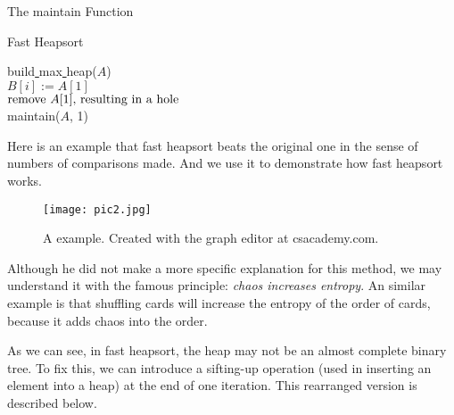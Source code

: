 \documentclass[12pt]{extarticle}
\newcommand{\<}{\langle}
\renewcommand{\>}{\rangle}
\theoremstyle{definition}
\newcommand{\udl}{\underline{ }}
\begin{document}
\begin{algorithm}[H]
	\caption{The {\con maintain} Function}
	\label{algo:heapsort_improved_maintain}
	\LinesNumbered
\end{algorithm}

\begin{algorithm}[H]
	\caption{Fast Heapsort}
	\label{algo:heapsort_improved}
	\LinesNumbered
	{\con build\udl max\udl heap($A$)} \\
		{
		{\con $B[i] := A[1]$} \\
		$\textnormal{remove } A[1] \textnormal{, resulting in a hole}$ \\
		{\con maintain($A$, 1)}
	}
\end{algorithm}

Here is an example that fast heapsort beats the original one in the sense of numbers of comparisons made. And we use it to demonstrate how fast heapsort works.

\begin{figure}[H]
	\centering
	\texttt{[image: pic2.jpg]}
	\caption{A example. Created with the graph editor at {\con csacademy.com}.}
	\label{plot2}
\end{figure}

Although he did not make a more specific explanation for this method, we may understand it with the famous principle: \textit{chaos increases entropy}. An similar example is that shuffling cards will increase the entropy of the order of cards, because it adds chaos into the order. 

As we can see, in fast heapsort, the heap may not be an almost complete binary tree. To fix this, we can introduce a sifting-up operation (used in inserting an element into a heap) at the end of one iteration. This rearranged version is described below.
\end{document}
